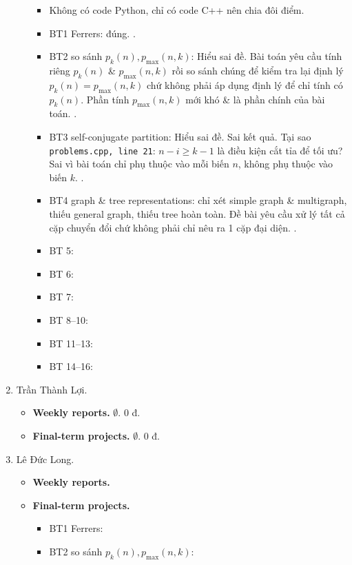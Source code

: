 \documentclass{article}
\begin{document}
\begin{enumerate}
\begin{itemize}
        \begin{itemize}
            \item Không có code Python, chỉ có code C++ nên chia đôi điểm.
            \item BT1 Ferrers: đúng. .
            \item BT2 so sánh $p_k(n),p_{\max}(n,k)$: Hiểu sai đề. Bài toán yêu cầu tính riêng $p_k(n)$ \& $p_{\max}(n,k)$ rồi so sánh chúng để kiểm tra lại định lý $p_k(n) = p_{\max}(n,k)$ chứ không phải áp dụng định lý để chỉ tính có $p_k(n)$. Phần tính $p_{\max}(n,k)$ mới khó \& là phần chính  của bài toán. .
            \item BT3 self-conjugate partition: Hiểu sai đề. Sai kết quả. Tại sao {\tt problems.cpp, line 21}: $n - i\ge k - 1$ là điều kiện cắt tỉa để tối ưu? Sai vì bài toán chỉ phụ thuộc vào mỗi biến $n$, không phụ thuộc vào biến $k$. .
            \item BT4 graph \& tree representations: chỉ xét simple graph \& multigraph, thiếu general graph, thiếu tree hoàn toàn. Đề bài yêu cầu xử lý tất cả cặp chuyển đổi chứ không phải chỉ nêu ra 1 cặp đại diện. .
            \item BT 5:
            \item BT 6:
            \item BT 7:
            \item BT 8--10:
            \item BT 11--13:
            \item BT 14--16:
        \end{itemize}
    \end{itemize}
    \item {\sc Trần Thành Lợi.}
    \begin{itemize}
        \item {\bf Weekly reports.} $\emptyset$. 0 đ.
        \item {\bf Final-term projects.} $\emptyset$. 0 đ.
    \end{itemize}
    \item {\sc Lê Đức Long.}
    \begin{itemize}
        \item {\bf Weekly reports.}
        \item {\bf Final-term projects.}
        \begin{itemize}
            \item BT1 Ferrers:
            \item BT2 so sánh $p_k(n),p_{\max}(n,k)$:

\end{itemize}
\end{itemize}
\end{enumerate}
\end{document}
